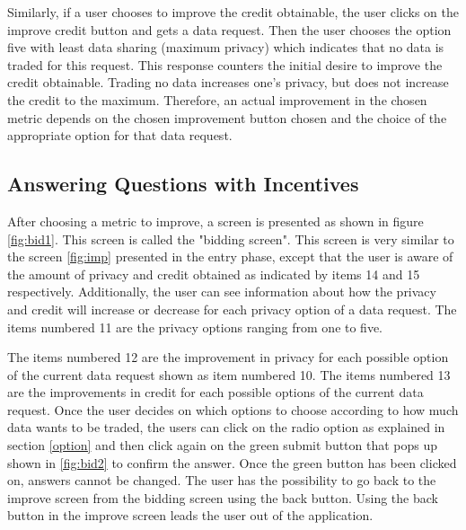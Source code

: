 Similarly, if a user chooses to improve the credit obtainable, the user clicks on the improve credit button and gets a data request. Then the user chooses the option five with least data sharing (maximum privacy) which indicates that no data is traded for this request. This response counters the initial desire to improve the credit obtainable. Trading no data increases one's privacy, but does not increase the credit to the maximum. Therefore, an actual improvement in the chosen metric depends on the chosen improvement button chosen and the choice of the appropriate option for that data request.

\subsection{Answering Questions with Incentives}

After choosing a metric to improve, a screen is presented as shown in figure \ref{fig:bid1}.
This screen is called the "bidding screen". This screen is very similar to the screen \ref{fig:imp} presented in the entry phase, except that the user
is aware of the amount of privacy and credit obtained as indicated by items 14 and 15 respectively. Additionally, the user can see information about how the privacy and credit will increase or decrease for each privacy option of a data request. The items numbered 11 are the privacy options ranging from one to five.


The items numbered 12 are the improvement in privacy for each possible option of the current data request shown as item numbered 10. The items numbered 13 are the improvements in credit for each possible options of the current data request. Once the user decides on which options to choose according to how much data wants to be traded, the users can click on the radio option as explained in section \ref{option} and then click again on the green submit button that pops up shown in \ref{fig:bid2} to confirm the answer. Once the green button has been clicked on, answers cannot be changed. The user has the possibility to go back to the improve screen from the bidding screen using the back button. Using the back button in the improve screen leads the user out of the application.


